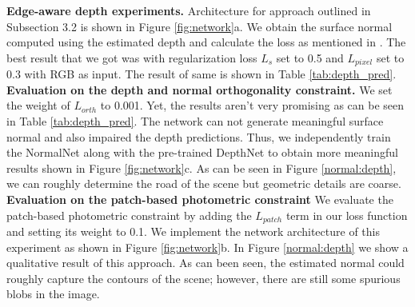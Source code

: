 \documentclass[10pt,twocolumn,letterpaper]{article}
\begin{document}
\noindent \textbf{Edge-aware depth experiments.}
Architecture for approach outlined in Subsection 3.2 is shown in Figure \ref{fig:network}a. We obtain the surface normal computed using the estimated depth and calculate the loss as mentioned in \cite{yang2017unsupervised}. The best result that we got was with regularization loss $L_s$ set to 0.5 and $L_{pixel}$ set to 0.3 with RGB as input. The result of same is shown in Table \ref{tab:depth_pred}.
\\
\textbf{Evaluation on the depth and normal orthogonality constraint.}
We set the weight of $L_{orth}$ to 0.001. Yet, the results aren't very promising as can be seen in Table \ref{tab:depth_pred}. The network can not generate meaningful surface normal and also impaired the depth predictions. Thus, we independently train the NormalNet along with the pre-trained DepthNet to obtain more meaningful results shown in Figure \ref{fig:network}c. As can be seen in Figure \ref{normal:depth}, we can roughly determine the road of the scene but geometric details are coarse.
\\
\textbf{Evaluation on the patch-based photometric constraint}
We evaluate the patch-based photometric constraint by adding the $L_{patch}$ term in our loss function and setting its weight to 0.1. We implement the network architecture of this experiment as shown in Figure \ref{fig:network}b. In Figure \ref{normal:depth} we show a qualitative result of this approach. As can been seen, the estimated normal could roughly capture the contours of the scene; however, there are still some spurious blobs in the image. 
\end{document}
